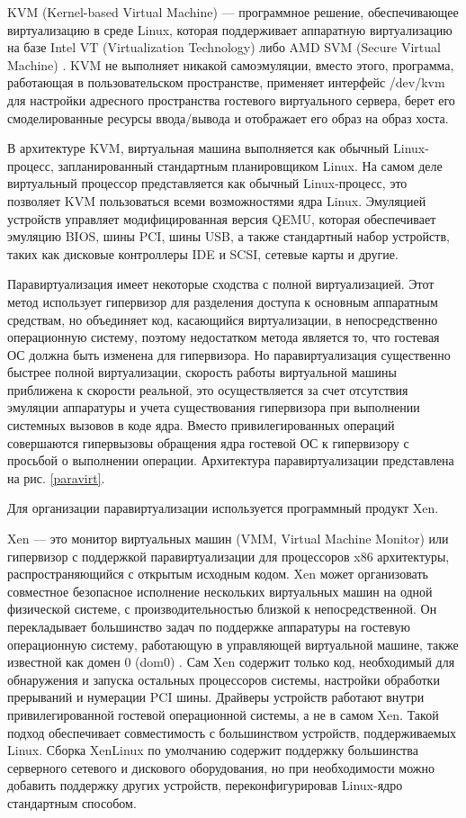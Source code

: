 KVM (Kernel-based Virtual Machine) --- программное решение, обеспечивающее виртуализацию в среде Linux, которая поддерживает аппаратную виртуализацию на базе Intel VT (Virtualization Technology) либо AMD SVM (Secure Virtual Machine) \cite{kvm-ibm}.
KVM не выполняет никакой самоэмуляции, вместо этого, программа, работающая в пользовательском пространстве, применяет интерфейс /dev/kvm для настройки адресного пространства гостевого виртуального сервера, берет его смоделированные ресурсы ввода/вывода и отображает его образ на образ хоста.

В архитектуре KVM, виртуальная машина выполняется как обычный Linux-процесс, запланированный стандартным планировщиком Linux.
На самом деле виртуальный процессор представляется как обычный Linux-процесс, это позволяет KVM пользоваться всеми возможностями ядра Linux.
Эмуляцией устройств управляет модифицированная версия QEMU, которая обеспечивает эмуляцию BIOS, шины PCI, шины USB, а также стандартный набор устройств, таких как дисковые контроллеры IDE и SCSI, сетевые карты и другие.

Паравиртуализация имеет некоторые сходства с полной виртуализацией.
Этот метод использует гипервизор для разделения доступа к основным аппаратным средствам, но объединяет код, касающийся виртуализации, в непосредственно операционную систему, поэтому недостатком метода является то, что гостевая ОС должна быть изменена для гипервизора.
Но паравиртуализация существенно быстрее полной виртуализации, скорость работы виртуальной машины приближена к скорости реальной, это осуществляется за счет отсутствия эмуляции аппаратуры и учета существования гипервизора при выполнении системных вызовов в коде ядра.
Вместо привилегированных операций совершаются гипервызовы обращения ядра гостевой ОС к гипервизору с просьбой о выполнении операции.
Архитектура паравиртуализации представлена на рис. \ref{paravirt}.

Для организации паравиртуализации используется программный продукт Xen.

Xen --- это монитор виртуальных машин (VMM, Virtual Machine Monitor) или гипервизор с поддержкой паравиртуализации для процессоров x86 архитектуры, распространяющийся с открытым исходным кодом.
Xen может организовать совместное безопасное исполнение нескольких виртуальных машин на одной физической системе, с производительностью близкой к непосредственной.
Он перекладывает большинство задач по поддержке аппаратуры на гостевую операционную систему, работающую в управляющей виртуальной машине, также известной как домен 0 (dom0) \cite{xen-xguru}.
Сам Xen содержит только код, необходимый для обнаружения и запуска остальных процессоров системы, настройки обработки прерываний и нумерации PCI шины.
Драйверы устройств работают внутри привилегированной гостевой операционной системы, а не в самом Xen.
Такой подход обеспечивает совместимость с большинством устройств, поддерживаемых Linux.
Сборка XenLinux по умолчанию содержит поддержку большинства серверного сетевого и дискового оборудования, но при необходимости можно добавить поддержку других устройств, переконфигурировав Linux-ядро стандартным способом.

